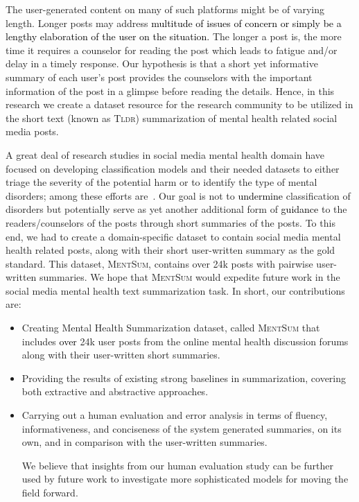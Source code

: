 \documentclass[10pt, a4paper]{article}
\newcommand{\tldr}{\textsc{Tldr}}
\newcommand{\mentsum}{\textsc{MentSum}}
\begin{document}
The user-generated content on many of such platforms might be of varying length. Longer posts may address \textcolor{black}{{multitude of issues of concern} or simply be a lengthy elaboration of the user on the situation.} The longer a post is, the more time it requires a counselor for reading the post which leads to fatigue and/or delay in a timely response.  Our hypothesis is that a short yet informative summary of each user's post provides the counselors with the important information of the post in a glimpse before reading the details. Hence, in this research we create a dataset resource for the research community to be utilized in the short text (known as \tldr) summarization of mental health related social media posts. 



A great deal of research studies in social media mental health domain have focused on developing classification models and their needed datasets to either triage the severity of the potential harm or to identify the type of mental disorders; among these efforts are~\cite{Choudhury2013PredictingDV,Coppersmith2014QuantifyingMH,Yates2017DepressionAS,Coppersmith2018NaturalLP,Cohan2018SMHDAL,Garg2021DetectingRL}.
Our goal is not to \textcolor{black}{undermine} classification of disorders but potentially serve as yet another additional form of \textcolor{black}{guidance} to the readers/counselors of the posts through short summaries of the posts. To this end, we had to create a domain-specific dataset to contain social media mental health related posts, along with their short user-written summary as the gold standard. This dataset, \mentsum, contains over 24k posts with pairwise user-written summaries. We hope that \mentsum{} would expedite future work in the social media mental health text summarization task. In short, our contributions are:

\begin{itemize}
    \item Creating Mental Health Summarization dataset, called \mentsum{} that includes \textcolor{black}{over} 24k user posts from the online mental health discussion forums along with their user-written short summaries. 
    \item Providing the results of existing strong baselines in summarization, covering both extractive and abstractive approaches.
    \item Carrying out a human evaluation and error analysis in terms of fluency, informativeness, and conciseness of the system generated summaries, on its own, and in comparison with the user-written summaries. 

    We believe that insights from our human evaluation study can be further used by future work to investigate more sophisticated models for moving the field forward. 
\end{itemize}
\end{document}
